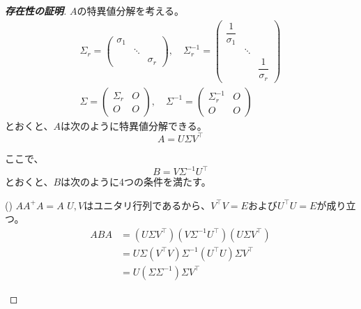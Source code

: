 \documentclass[../../../topic_linear-algebra]{subfiles}
\begin{document}
\begin{proof}[\bfseries 存在性の証明]
    $A$の特異値分解を考える。
    \begin{gather*}
      \Sigma_r = \begin{pmatrix}
        \sigma_1 &        &           \\
                  & \ddots &           \\
                  &        & \sigma_r
      \end{pmatrix}, \quad
      \Sigma^{-1}_r = \begin{pmatrix}
        \dfrac{1}{\sigma_1} &        &           \\
                            & \ddots &           \\
                            &        & \dfrac{1}{\sigma_r}
      \end{pmatrix} \\
      \Sigma = \begin{pmatrix}
        \Sigma_r & O \\
        O & O
      \end{pmatrix}, \quad
      \Sigma^{-1} = \begin{pmatrix}
        \Sigma^{-1}_r & O \\
        O & O
      \end{pmatrix}
    \end{gather*}
    とおくと、$A$は次のように特異値分解できる。
    \begin{equation*}
      A = U \Sigma V^\top
    \end{equation*}
        
    ここで、
    \begin{equation*}
      B = V \Sigma^{-1} U^\top
    \end{equation*}
    とおくと、$B$は次のように4つの条件を満たす。
  
    \begin{subpattern}{() $AA^+A = A$}
      $U,V$はユニタリ行列であるから、$V^\top V = E$および$U^\top U = E$が成り立つ。
      \begin{align*}
        ABA &= (U \Sigma V^\top)(V \Sigma^{-1} U^\top)(U \Sigma V^\top) \\
             &= U \Sigma (V^\top V) \Sigma^{-1} (U^\top U) \Sigma V^\top \\
             &= U(\Sigma \Sigma^{-1}) \Sigma V^\top
      \end{align*}
      
      \br
      

\end{subpattern}
\end{proof}
\end{document}
